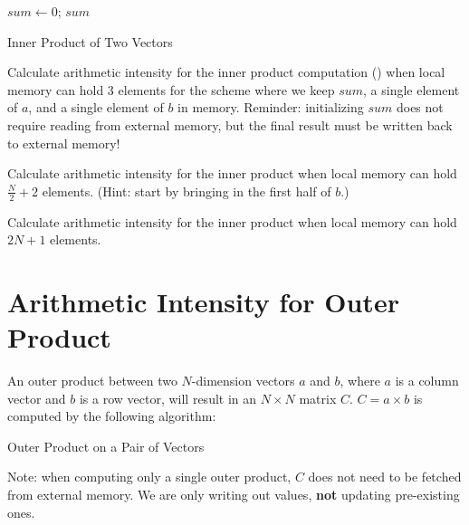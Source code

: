 \documentclass[a4 paper]{article}
\begin{document}
\begin{algorithm}
\SetAlgoLined
\SetInd{0.25em}{0.5em}
$sum \longleftarrow 0$;
\Return $sum$
\caption{Inner Product of Two Vectors}
\label{algo:inner-product}
\end{algorithm}

Calculate arithmetic intensity for the inner product computation () when local memory can hold 3 elements for the scheme where we keep $sum$, a single element of $a$, and a single element of $b$ in memory.
Reminder: initializing $sum$ does not require reading from external memory, but the final result must be written back to external memory!


Calculate arithmetic intensity for the inner product when local memory can hold $\frac{N}{2} + 2$ elements.
(Hint: start by bringing in the first half of $b$.)



Calculate arithmetic intensity for the inner product when local memory can hold $2N + 1$ elements.


\section{Arithmetic Intensity for Outer Product}
\label{sec:op_ai}
An outer product between two $N$-dimension vectors $a$ and $b$, where $a$ is a column vector and $b$ is a row vector, will result in an $N \times N$ matrix $C$.
$C = a \times b$ is computed by the following algorithm:

\begin{algorithm}
\SetAlgoLined
\SetInd{0.25em}{0.5em}
\caption{Outer Product on a Pair of Vectors}
\label{algo:outer-product}
\end{algorithm}
\noindent
Note: when computing only a single outer product, $C$ does not need to be fetched from external memory.
We are only writing out values, \textbf{not} updating pre-existing ones.
\end{document}
